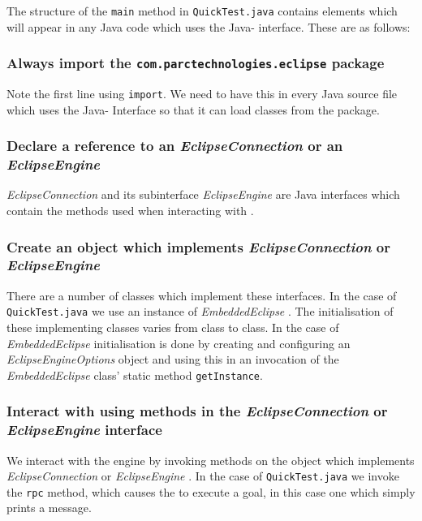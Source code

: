 The structure of the {\tt main} method in {\tt QuickTest.java}
contains elements which will appear in any Java code which uses the
Java-{\eclipse} interface. These are as follows:

\subsubsection*{Always import the {\tt com.parctechnologies.eclipse} package}
Note the first line using {\tt import}. We need to have this in every
Java source file which uses the Java-{\eclipse} Interface so that it can
load classes from the package.

\subsubsection*{Declare a reference to an {\it EclipseConnection} or an {\it EclipseEngine}}

{\it EclipseConnection}  and its
subinterface {\it EclipseEngine}  are Java
interfaces which contain the methods used when interacting with {\eclipse}.

\subsubsection*{Create an object which implements {\it EclipseConnection} or {\it EclipseEngine}}
There are a number of classes which implement these interfaces. In the case
of {\tt QuickTest.java} we use an instance of {\it EmbeddedEclipse}
. The initialisation of these implementing
classes varies from class to class. In the case of {\it EmbeddedEclipse}
initialisation is done by creating and configuring an {\it
EclipseEngineOptions} object and using this in an invocation of the {\it
EmbeddedEclipse} class' static method {\tt getInstance}.

\subsubsection*{Interact with {\eclipse} using methods in the {\it EclipseConnection} or {\it EclipseEngine} interface}

We interact with the {\eclipse} engine by invoking methods on the object
which implements {\it EclipseConnection}  or {\it EclipseEngine} . In the
case of {\tt QuickTest.java} we invoke the {\tt rpc} method, which causes
the {\eclipse} to execute a goal, in this case one which simply prints a
message.

